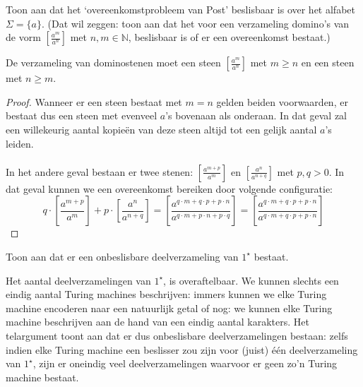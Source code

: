 \documentclass[a4paper]{article}
\begin{document}
\begin{question}
Toon aan dat het `overeenkomstprobleem van Post' beslisbaar is over het alfabet $\Sigma = \{ a \}$. (Dat wil zeggen: toon aan dat het voor een verzameling domino's van de vorm $\left[ \frac{a^m}{a^n} \right]$ met $n,m \in \mathbb{N}$, beslisbaar is of er een overeenkomst bestaat.) 
\begin{answer}
De verzameling van dominostenen moet een steen $\left[\frac{a^m}{a^n}\right]$ met $m\geq n$ en een steen met $n\geq m$.
\begin{proof}
Wanneer er een steen bestaat met $m=n$ gelden beiden voorwaarden, er bestaat dus een steen met evenveel $a$'s bovenaan als onderaan. In dat geval zal een willekeurig aantal kopie\"en van deze steen altijd tot een gelijk aantal $a$'s leiden.
\paragraph{}
In het andere geval bestaan er twee stenen: $\left[\frac{a^{m+p}}{a^m}\right]$ en $\left[\frac{a^n}{a^{n+q}}\right]$ met $p,q>0$. In dat geval kunnen we een overeenkomst bereiken door volgende configuratie:
\begin{equation}
q\cdot\left[\frac{a^{m+p}}{a^m}\right]+p\cdot\left[\frac{a^n}{a^{n+q}}\right]=\left[\frac{a^{q\cdot m+q\cdot p+p\cdot n}}{a^{q\cdot m+p\cdot n+p\cdot q}}\right]=\left[\frac{a^{q\cdot m+q\cdot p+p\cdot n}}{a^{q\cdot m+q\cdot p+p\cdot n}}\right]
\end{equation}
\end{proof}
\end{answer}
\end{question}

\begin{question}
Toon aan dat er een onbeslisbare deelverzameling van $1^{\star}$ bestaat.
\begin{answer}
Het aantal deelverzamelingen van $1^{\star}$, is overaftelbaar. We kunnen slechts een eindig aantal Turing machines beschrijven: immers kunnen we elke Turing machine encoderen naar een natuurlijk getal of nog: we kunnen elke Turing machine beschrijven aan de hand van een eindig aantal karakters. Het telargument toont aan dat er dus onbeslisbare deelverzamelingen bestaan: zelfs indien elke Turing machine een beslisser zou zijn voor (juist) \'e\'en deelverzameling van $1^{\star}$, zijn er oneindig veel deelverzamelingen waarvoor er geen zo'n Turing machine bestaat.
\end{answer}
\end{question}
\end{document}
